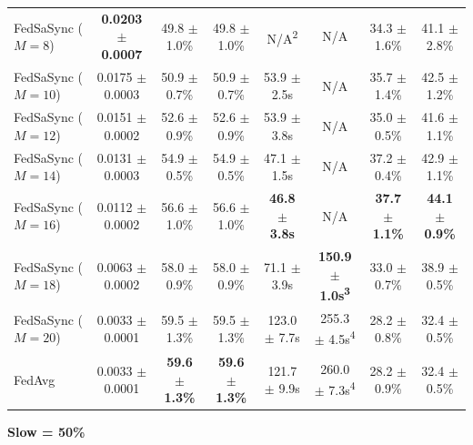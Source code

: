 \begin{table}[t]
{\begin{tabular}{lccccccc}
\hline
FedSaSync ($M = 8$) & \textbf{0.0203 $\pm$ 0.0007} & 49.8 $\pm$ 1.0\% & 49.8 $\pm$ 1.0\% & N/A\textsuperscript{2} & N/A & 34.3 $\pm$ 1.6\% & 41.1 $\pm$ 2.8\% \\
FedSaSync ($M = 10$) & 0.0175 $\pm$ 0.0003 & 50.9 $\pm$ 0.7\% & 50.9 $\pm$ 0.7\% & 53.9 $\pm$ 2.5s & N/A & 35.7 $\pm$ 1.4\% & 42.5 $\pm$ 1.2\% \\
FedSaSync ($M = 12$) & 0.0151 $\pm$ 0.0002 & 52.6 $\pm$ 0.9\% & 52.6 $\pm$ 0.9\% & 53.9 $\pm$ 3.8s & N/A & 35.0 $\pm$ 0.5\% & 41.6 $\pm$ 1.1\% \\
FedSaSync ($M = 14$) & 0.0131 $\pm$ 0.0003 & 54.9 $\pm$ 0.5\% & 54.9 $\pm$ 0.5\% & 47.1 $\pm$ 1.5s & N/A & 37.2 $\pm$ 0.4\% & 42.9 $\pm$ 1.1\% \\
FedSaSync ($M = 16$) & 0.0112 $\pm$ 0.0002 & 56.6 $\pm$ 1.0\% & 56.6 $\pm$ 1.0\% & \textbf{46.8 $\pm$ 3.8s} & N/A & \textbf{37.7 $\pm$ 1.1\%} & \textbf{44.1 $\pm$ 0.9\%} \\
FedSaSync ($M = 18$) & 0.0063 $\pm$ 0.0002 & 58.0 $\pm$ 0.9\% & 58.0 $\pm$ 0.9\% & 71.1 $\pm$ 3.9s & \textbf{150.9 $\pm$ 1.0s\textsuperscript{3}} & 33.0 $\pm$ 0.7\% & 38.9 $\pm$ 0.5\% \\
FedSaSync ($M = 20$) & 0.0033 $\pm$ 0.0001 & 59.5 $\pm$ 1.3\% & 59.5 $\pm$ 1.3\% & 123.0 $\pm$ 7.7s & 255.3 $\pm$ 4.5s\textsuperscript{4} & 28.2 $\pm$ 0.8\% & 32.4 $\pm$ 0.5\% \\
FedAvg & 0.0033 $\pm$ 0.0001 & \textbf{59.6 $\pm$ 1.3\%} & \textbf{59.6 $\pm$ 1.3\%} & 121.7 $\pm$ 9.9s & 260.0 $\pm$ 7.3s\textsuperscript{4} & 28.2 $\pm$ 0.9\% & 32.4 $\pm$ 0.5\% \\
\hline
\end{tabular}%
}
\par\vspace{0.8em}
\noindent\textbf{Slow = 50\%} \\[0.2em]
\end{table}
